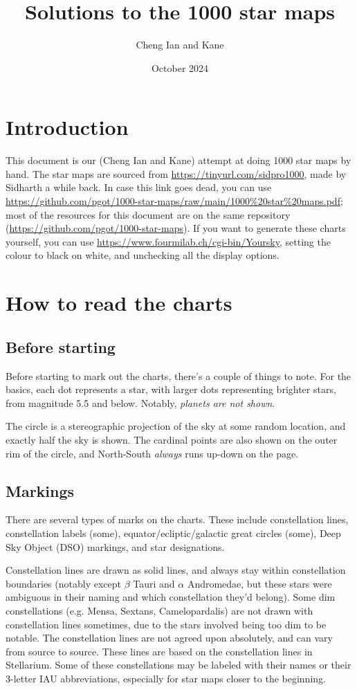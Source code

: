 \documentclass{article}
\title{Solutions to the 1000 star maps}
\author{Cheng Ian and Kane}
\date{October 2024}
\begin{document}
\begin{titlingpage}
\maketitle
\end{titlingpage}

\section{Introduction}
This document is our (Cheng Ian and Kane) attempt at doing 1000 star maps by hand. The star maps are sourced from \url{https://tinyurl.com/sidpro1000}, made by Sidharth a while back. In case this link goes dead, you can use \url{https://github.com/pgot/1000-star-maps/raw/main/1000%20star%20maps.pdf}; most of the resources for this document are on the same repository (\url{https://github.com/pgot/1000-star-maps}). If you want to generate these charts yourself, you can use \url{https://www.fourmilab.ch/cgi-bin/Yoursky}, setting the colour to black on white, and unchecking all the display options.

\section{How to read the charts}
\subsection{Before starting}
Before starting to mark out the charts, there's a couple of things to note. For the basics, each dot represents a star, with larger dots representing brighter stars, from magnitude 5.5 and below. Notably, \textit{planets are not shown}.

The circle is a stereographic projection of the sky at some random location, and exactly half the sky is shown. The cardinal points are also shown on the outer rim of the circle, and North-South \textit{always} runs up-down on the page.
\subsection{Markings}
There are several types of marks on the charts. These include constellation lines, constellation labels (some), equator/ecliptic/galactic great circles (some), Deep Sky Object (DSO) markings, and star designations.

Constellation lines are drawn as solid lines, and always stay within constellation boundaries (notably except \(\beta\) Tauri and \(\alpha\) Andromedae, but these stars were ambiguous in their naming and which constellation they'd belong). Some dim constellations (e.g. Mensa, Sextans, Camelopardalis) are not drawn with constellation lines sometimes, due to the stars involved being too dim to be notable. The constellation lines are not agreed upon absolutely, and can vary from source to source. These lines are based on the constellation lines in Stellarium. Some of these constellations may be labeled with their names or their 3-letter IAU abbreviations, especially for star maps closer to the beginning.
\end{document}
